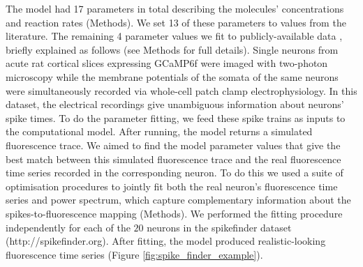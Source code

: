 \documentclass[a4paper,12pt]{article}
\theoremstyle{definition}
\begin{document}
The model had 17 parameters in total describing the molecules’ concentrations and reaction rates (Methods). We set 13 of these parameters to values from the literature. The remaining 4 parameter values we fit to publicly-available data \cite{berens}, briefly explained as follows (see Methods for full details).  Single neurons from acute rat cortical slices expressing GCaMP6f were imaged with two-photon microscopy while the membrane potentials of the somata of the same neurons were simultaneously recorded via whole-cell patch clamp electrophysiology. In this dataset, the electrical recordings give unambiguous information about neurons' spike times. To do the parameter fitting, we feed these spike trains as inputs to the computational model. After running, the model returns a simulated fluorescence trace. We aimed to find the model parameter values that give the best match between this simulated fluorescence trace and the real fluorescence time series recorded in the corresponding neuron. To do this we used a suite of optimisation procedures to jointly fit both the real neuron’s fluorescence time series and power spectrum, which capture complementary information about the spikes-to-fluorescence mapping (Methods). We performed the fitting procedure independently for each of the $20$ neurons in the spikefinder dataset (http://spikefinder.org). After fitting, the model produced realistic-looking fluorescence time series (Figure \ref{fig:spike_finder_example}).
\end{document}
